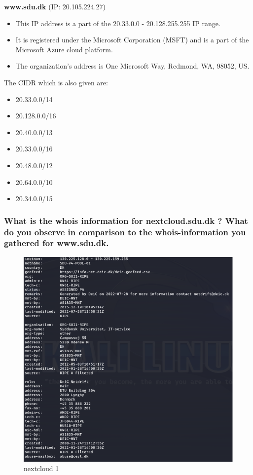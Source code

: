 \textbf{www.sdu.dk} (IP: 20.105.224.27)
\begin{itemize}
    \item This IP address is a part of the 20.33.0.0 - 20.128.255.255 IP range.
    \item It is registered under the Microsoft Corporation (MSFT) and is a part of the Microsoft Azure cloud platform.
    \item The organization's address is One Microsoft Way, Redmond, WA, 98052, US.
\end{itemize}

The CIDR which is also given are:
\begin{itemize}
    \item 20.33.0.0/14
    \item 20.128.0.0/16
    \item 20.40.0.0/13
    \item 20.33.0.0/16
    \item 20.48.0.0/12
    \item 20.64.0.0/10
    \item 20.34.0.0/15
\end{itemize}




\subsubsection{What is the whois information for nextcloud.sdu.dk ? What do you observe in comparison to the whois-information you gathered for www.sdu.dk.}

\begin{figure}[H]
    \centering
    \includegraphics[width=\linewidth]{pic/nextcloud 1.png}
    \caption{nextcloud 1}
    \label{fig:nextcloud 1}
\end{figure}

